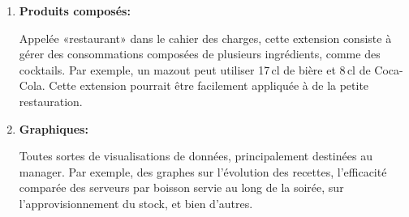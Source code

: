 \documentclass[a4paper,10pt]{article}
\begin{document}

\begin{enumerate}
    \item \textbf{Produits composés:}
    
    Appelée «restaurant» dans le cahier des charges, cette extension consiste à gérer des consommations composées de plusieurs ingrédients, comme des cocktails. Par exemple, un mazout peut utiliser 17\,cl de bière et 8\,cl de Coca-Cola. Cette extension pourrait être facilement appliquée à de la petite restauration.
    
    \item \textbf{Graphiques:}
    
    Toutes sortes de visualisations de données, principalement destinées au manager. Par exemple, des graphes sur l'évolution des recettes, l'efficacité comparée des serveurs par boisson servie au long de la soirée, sur l'approvisionnement du stock, et bien d'autres.
\end{enumerate}
\end{document}
